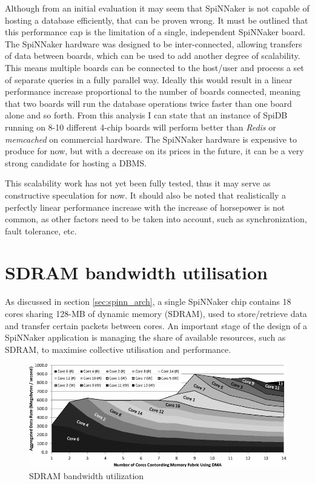 Although from an initial evaluation it may seem that SpiNNaker is not capable of hosting a database efficiently, that can be proven wrong. It must be outlined that this performance cap is the limitation of a single, independent SpiNNaker board. The SpiNNaker hardware was designed to be inter-connected, allowing transfers of data between boards, which can be used to add another degree of scalability. This means multiple boards can be connected to the host/user and process a set of separate queries in a fully parallel way. Ideally this would result in a linear performance increase proportional to the number of boards connected, meaning that two boards will run the database operations twice faster than one board alone and so forth. From this analysis I can state that an instance of SpiDB running on 8-10 different 4-chip boards will perform better than \textit{Redis} or \textit{memcached} on commercial hardware. The SpiNNaker hardware is expensive to produce for now, but with a decrease on its prices in the future, it can be a very strong candidate for hosting a DBMS.

This scalability work has not yet been fully tested, thus it may serve as constructive speculation for now. It should also be noted that realistically a perfectly linear performance increase with the increase of horsepower is not common, as other factors need to be taken into account, such as synchronization, fault tolerance, etc.


\section{SDRAM bandwidth utilisation}
\label{sec:limitations}
As discussed in section \ref{sec:spinn_arch}, a single SpiNNaker chip contains 18 cores sharing 128-MB of dynamic memory (SDRAM), used to store/retrieve data and transfer certain packets between cores. An important stage of the design of a SpiNNaker application is managing the share of available resources, such as SDRAM, to maximise collective utilisation and performance.

\begin{figure}
\begin{center}
	\includegraphics[width=1.3\textwidth, natwidth=820, natheight=329]{images/sdram_bandwidth.png}
\end{center}
\caption{SDRAM bandwidth utilization}
\label{fig:sdram_bandwidth}
\end{figure}

